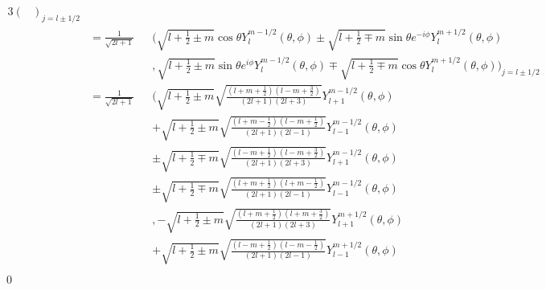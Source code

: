 \documentclass[uplatex,dvipdfmx,a4paper,11pt]{jlreq}
\makeatletter
\numberwithin{equation}{section}
\theoremstyle{definition}
\renewenvironment{proof}[1][\proofname]{\par
  \normalfont
  \topsep6\p@\@plus6\p@ \trivlist
  \item[\hskip\labelsep{\bfseries #1}\@addpunct{\bfseries}]\ignorespaces\quad\par
}{%
  \qed\endtrivlist\@endpefalse
}
\renewcommand\proofname{証明}
\makeatother
\begin{document}
\begin{proof}
\begin{alignat}{3}
\begin{pmatrix}
    \end{pmatrix}_{j = l\pm 1/2}                                                                                                                                                                                                             \\
                                                                       & = \frac{1}{\sqrt{2l + 1}}       &  & \Bigg(\sqrt{l + \frac{1}{2} \pm m}\cos\theta Y_l^{m - 1/2}(\theta, \phi) \pm\sqrt{l + \frac{1}{2} \mp m}\sin\theta e^{-i\phi}Y_l^{m + 1/2}(\theta, \phi)                 \\
                                                                       &                                 &  & , \sqrt{l + \frac{1}{2} \pm m}\sin\theta e^{i\phi}Y_l^{m - 1/2}(\theta, \phi) \mp\sqrt{l + \frac{1}{2} \mp m}\cos\theta Y_l^{m + 1/2}(\theta, \phi)\Bigg)_{j = l\pm 1/2} \\
                                                                       & = \frac{1}{\sqrt{2l + 1}}       &  & \Bigg(\sqrt{l + \frac{1}{2} \pm m}\sqrt{\frac{(l + m + \frac{1}{2})(l - m + \frac{3}{2})}{(2l + 1)(2l + 3)}}Y_{l+1}^{m-1/2}(\theta, \phi)                                \\
                                                                       &                                 &  & + \sqrt{l + \frac{1}{2} \pm m}\sqrt{\frac{(l + m - \frac{1}{2})(l - m + \frac{1}{2})}{(2l + 1)(2l - 1)}}Y_{l-1}^{m-1/2}(\theta, \phi)                                    \\
                                                                       &                                 &  & \pm\sqrt{l + \frac{1}{2} \mp m}\sqrt{\frac{(l - m + \frac{1}{2})(l - m + \frac{3}{2})}{(2l + 1)(2l + 3)}}Y_{l+1}^{m-1/2}(\theta, \phi)                                   \\
                                                                       &                                 &  & \pm\sqrt{l + \frac{1}{2} \mp m}\sqrt{\frac{(l + m + \frac{1}{2})(l + m - \frac{1}{2})}{(2l + 1)(2l - 1)}}Y_{l-1}^{m-1/2}(\theta, \phi)                                   \\
                                                                       &                                 &  & , -\sqrt{l + \frac{1}{2} \pm m}\sqrt{\frac{(l + m + \frac{1}{2})(l + m + \frac{3}{2})}{(2l + 1)(2l + 3)}}Y_{l+1}^{m+1/2}(\theta, \phi)                                   \\
                                                                       &                                 &  & + \sqrt{l + \frac{1}{2} \pm m}\sqrt{\frac{(l - m + \frac{1}{2})(l - m - \frac{1}{2})}{(2l + 1)(2l - 1)}}Y_{l-1}^{m+1/2}(\theta, \phi)                                    \\

\end{alignat}
\end{proof}
\end{document}

